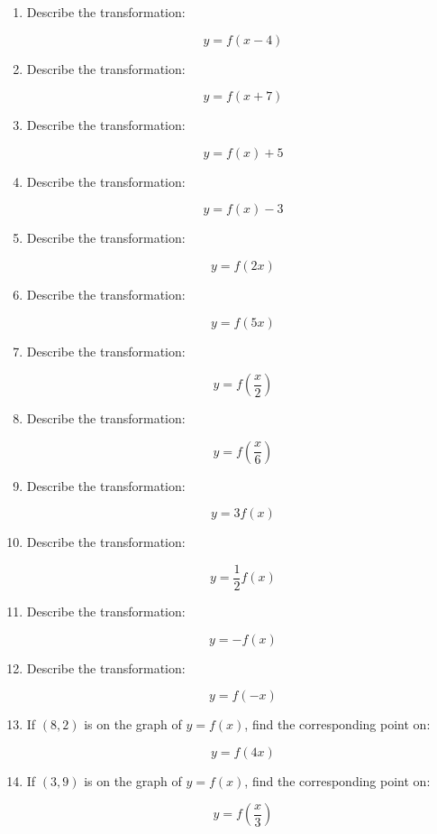 \documentclass[11pt]{article}
\begin{document}
\begin{enumerate}

\item Describe the transformation:

\[
y=f(x-4)
\]

\item Describe the transformation:

\[
y=f(x+7)
\]

\item Describe the transformation:

\[
y=f(x)+5
\]

\item Describe the transformation:

\[
y=f(x)-3
\]

\item Describe the transformation:

\[
y=f(2x)
\]

\item Describe the transformation:

\[
y=f(5x)
\]

\item Describe the transformation:

\[
y=f\left(\frac{x}{2}\right)
\]

\item Describe the transformation:

\[
y=f\left(\frac{x}{6}\right)
\]

\item Describe the transformation:

\[
y=3f(x)
\]

\item Describe the transformation:

\[
y=\frac12 f(x)
\]

\item Describe the transformation:

\[
y=-f(x)
\]

\item Describe the transformation:

\[
y=f(-x)
\]

\item If $(8,2)$ is on the graph of $y=f(x)$, find the corresponding point on:

\[
y=f(4x)
\]

\item If $(3,9)$ is on the graph of $y=f(x)$, find the corresponding point on:

\[
y=f\left(\frac{x}{3}\right)
\]


\end{enumerate}
\end{document}

